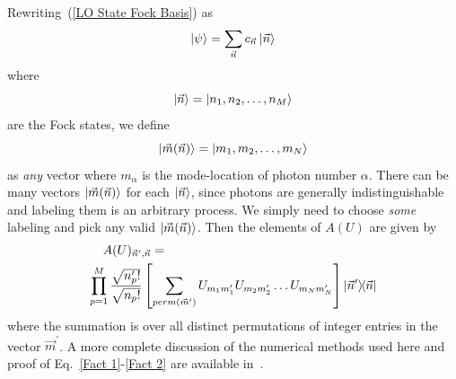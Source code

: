 \documentclass[aps,pra,twocolumn,showpacs,superscriptaddress,floatfix,10pt]{revtex4}
\begin{document}
Rewriting~(\ref{LO State Fock Basis}) as
\begin{equation}
\label{LO State Fock Vec Basis}
\ket{\psi} = \sum_{\vec{n}} c_{\vec{n}} \ket{\vec{n}}
\end{equation}
where
\begin{equation}
\ket{\vec{n}} = \ket{n_1,n_2,\dots,n_M}
\end{equation}
are the Fock states, we define
\begin{equation}
\label{m definition}
\ket{\vec{m}(\vec{n})} = \ket{m_1,m_2,\dots,m_N}
\end{equation}
as \textit{any} vector where $m_\alpha$ is the mode-location of photon number $\alpha$. There can be many vectors $\ket{\vec{m}(\vec{n})}$ for each $\ket{\vec{n}}$, since photons are generally indistinguishable and labeling them is an arbitrary process. We simply need to choose \textit{some} labeling and pick any valid $\ket{\vec{m}(\vec{n})}$. Then the elements of $A(U)$ are given by
\begin{eqnarray}
\label{Fact 2}
A(U)_{\vec{n}^\prime,\vec{n}} = \quad \quad \quad \quad \quad \quad \quad \quad \quad \quad \quad \quad \quad \quad \quad \quad \quad \\ \small \nonumber \prod_{p=1}^{M} \frac{\sqrt{n_p^\prime !}}{\sqrt{n_p !}} \left[\sum_{perm(\vec{m}^\prime)} U_{m_1 m_1^\prime} U_{m_2 m_2^\prime} \dots U_{m_N m_N^\prime} \right] \outerproduct{\vec{n}^\prime}{\vec{n}} 
\end{eqnarray}
where the summation is over all distinct permutations of integer entries in the vector $\vec{m}^\prime$. A more complete discussion of the numerical methods used here and proof of Eq.~\ref{Fact 1}-\ref{Fact 2} are available in~\cite{Jake Smith}.
\end{document}
